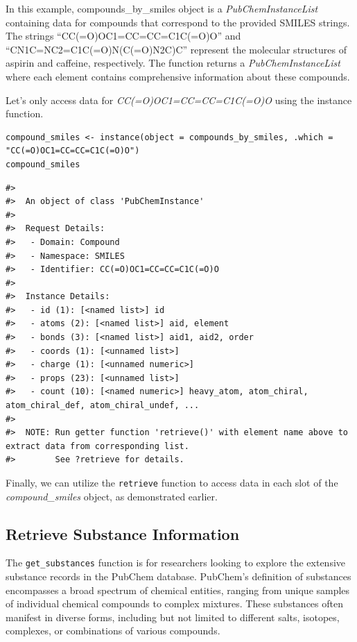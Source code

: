 In this example, compounds\_by\_smiles object is a \emph{PubChemInstanceList} containing data for compounds that correspond to the provided SMILES strings. The strings ``CC(=O)OC1=CC=CC=C1C(=O)O'' and ``CN1C=NC2=C1C(=O)N(C(=O)N2C)C'' represent the molecular structures of aspirin and caffeine, respectively. The function returns a \emph{PubChemInstanceList} where each element contains comprehensive information about these compounds.

Let's only access data for \emph{CC(=O)OC1=CC=CC=C1C(=O)O} using the instance function.

\begin{verbatim}
compound_smiles <- instance(object = compounds_by_smiles, .which = "CC(=O)OC1=CC=CC=C1C(=O)O")
compound_smiles
\end{verbatim}

\begin{verbatim}
#> 
#>  An object of class 'PubChemInstance'
#> 
#>  Request Details:  
#>   - Domain: Compound
#>   - Namespace: SMILES
#>   - Identifier: CC(=O)OC1=CC=CC=C1C(=O)O
#> 
#>  Instance Details:  
#>   - id (1): [<named list>] id
#>   - atoms (2): [<named list>] aid, element
#>   - bonds (3): [<named list>] aid1, aid2, order
#>   - coords (1): [<unnamed list>] 
#>   - charge (1): [<unnamed numeric>] 
#>   - props (23): [<unnamed list>] 
#>   - count (10): [<named numeric>] heavy_atom, atom_chiral, atom_chiral_def, atom_chiral_undef, ...
#> 
#>  NOTE: Run getter function 'retrieve()' with element name above to extract data from corresponding list. 
#>        See ?retrieve for details.
\end{verbatim}

Finally, we can utilize the \texttt{retrieve} function to access data in each slot of the \emph{compound\_smiles} object, as demonstrated earlier.

\hypertarget{retrieve-substance-information}{%
\subsection{Retrieve Substance Information}\label{retrieve-substance-information}}

The \texttt{get\_substances} function is for researchers looking to explore the extensive substance records in the PubChem database. PubChem's definition of substances encompasses a broad spectrum of chemical entities, ranging from unique samples of individual chemical compounds to complex mixtures. These substances often manifest in diverse forms, including but not limited to different salts, isotopes, complexes, or combinations of various compounds.

